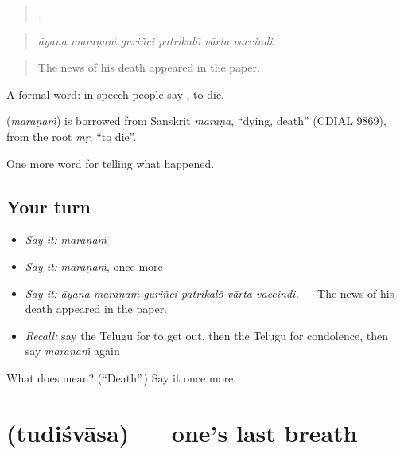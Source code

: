 \begin{quote}
     .
\end{quote}

\begin{quote}
\emph{āyana maraṇaṁ guriñci patrikalō vārta vaccindi.}
\end{quote}

\begin{quote}
The news of his death appeared in the paper.
\end{quote}

A formal word: in speech people say , to die.

\begin{cousinweb}
\textbf{} (\emph{maraṇaṁ}) is borrowed from Sanskrit \emph{maraṇa}, \textquotedblleft{}dying, death\textquotedblright{} (CDIAL 9869), from the root \emph{mṛ}, \textquotedblleft{}to die\textquotedblright{}.
\end{cousinweb}

\begin{grammarlens}[title={What you've built}]
One more word for telling what happened.
\end{grammarlens}

\subsection*{Your turn}
\begin{itemize}
\raggedright
  \item \emph{Say it:} \emph{maraṇaṁ}
  \item \emph{Say it:} \emph{maraṇaṁ}, once more
  \item \emph{Say it:} \emph{āyana maraṇaṁ guriñci patrikalō vārta vaccindi.} — The news of his death appeared in the paper.
  \item \emph{Recall:} say the Telugu for to get out, then the Telugu for condolence, then say \emph{maraṇaṁ} again
\end{itemize}

\begin{tcolorbox}[breakable,colback=teal!4,colframe=teal!35!black,title={Before you move on}]
What does  mean? (\textquotedblleft{}Death\textquotedblright{}.) Say it once more.
\end{tcolorbox}
\section[\texorpdfstring{\te{తుదిశ్వాస} (tudiśvāsa)}{తుదిశ్వాస (tudiśvāsa)}]{ (tudiśvāsa) — one's last breath}

